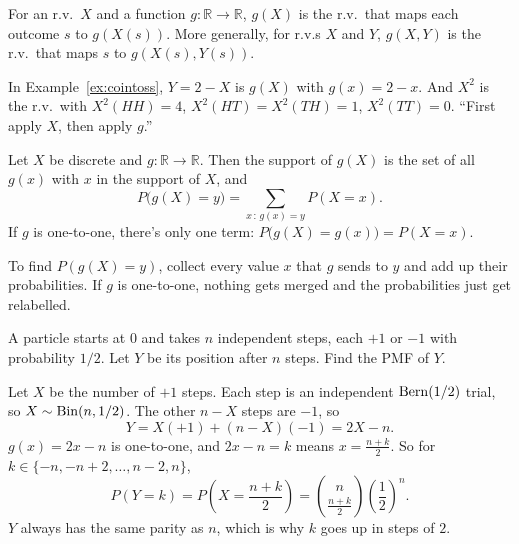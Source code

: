 \bigskip

\begin{definition}[Function of an r.v.]\label{def:gX}
For an r.v.\ $X$ and a function $g : \mathbb{R} \to \mathbb{R}$, $g(X)$ is the r.v.\ that maps each outcome $s$ to $g(X(s))$. More generally, for r.v.s $X$ and $Y$, $g(X, Y)$ is the r.v.\ that maps $s$ to $g(X(s), Y(s))$.
\end{definition}

\bigskip

\begin{example}
In Example~\ref{ex:cointoss}, $Y = 2 - X$ is $g(X)$ with $g(x) = 2 - x$. And $X^{2}$ is the r.v.\ with $X^{2}(HH) = 4$, $X^{2}(HT) = X^{2}(TH) = 1$, $X^{2}(TT) = 0$. ``First apply $X$, then apply $g$.''
\end{example}

\bigskip

\begin{theorem}[PMF of $g(X)$]\label{thm:pmfgX}
Let $X$ be discrete and $g : \mathbb{R} \to \mathbb{R}$. Then the support of $g(X)$ is the set of all $g(x)$ with $x$ in the support of $X$, and
\medskip
\[
P\bigl(g(X) = y\bigr) = \sum_{x \,:\, g(x) = y} P(X = x).
\]
\medskip
If $g$ is one-to-one, there's only one term: $P\bigl(g(X) = g(x)\bigr) = P(X = x)$.
\end{theorem}

\bigskip

\begin{intuition}
To find $P(g(X) = y)$, collect every value $x$ that $g$ sends to $y$ and add up their probabilities. If $g$ is one-to-one, nothing gets merged and the probabilities just get relabelled.
\end{intuition}

\bigskip

\begin{example}\label{ex:randomwalk}
A particle starts at $0$ and takes $n$ independent steps, each $+1$ or $-1$ with probability $1/2$. Let $Y$ be its position after $n$ steps. Find the PMF of $Y$.
\end{example}

\medskip

\begin{solution}
Let $X$ be the number of $+1$ steps. Each step is an independent $\operatorname{Bern}(1/2)$ trial, so $X \sim \operatorname{Bin}(n, 1/2)$. The other $n - X$ steps are $-1$, so
\medskip
\[
Y = X(+1) + (n - X)(-1) = 2X - n.
\]
\medskip
$g(x) = 2x - n$ is one-to-one, and $2x - n = k$ means $x = \tfrac{n + k}{2}$. So for $k \in \{-n, -n + 2, \dots, n - 2, n\}$,
\medskip
\[
P(Y = k) = P\!\left(X = \frac{n + k}{2}\right) = \binom{n}{\frac{n + k}{2}} \left(\frac{1}{2}\right)^{n}.
\]
\medskip
$Y$ always has the same parity as $n$, which is why $k$ goes up in steps of $2$.
\end{solution}

